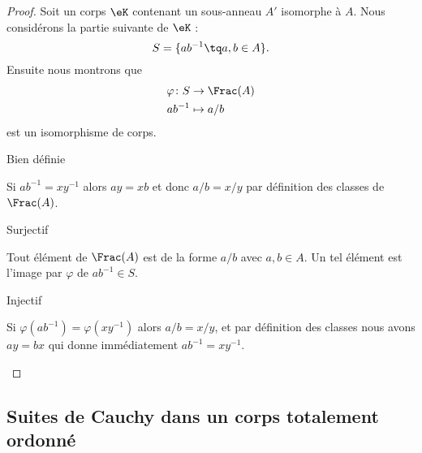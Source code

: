 \begin{proof}
    Soit un corps \( \eK\) contenant un sous-anneau \( A'\) isomorphe à \( A\). Nous considérons la partie suivante de \( \eK\) :
    \begin{equation}
        S=\{ ab^{-1}\tq a,b\in A \}.
    \end{equation}
    Ensuite nous montrons que
    \begin{equation}
        \begin{aligned}
            \varphi\colon S&\to \Frac(A) \\
            ab^{-1}&\mapsto a/b
        \end{aligned}
    \end{equation}
    est un isomorphisme de corps.

    \begin{subproof}
        \item[Bien définie]

            Si \( ab^{-1}=xy^{-1}\) alors \( ay=xb\) et donc \( a/b=x/y\) par définition des classes de \( \Frac(A)\).

        \item[Surjectif]

            Tout élément de \( \Frac(A)\) est de la forme \( a/b\) avec \( a,b\in A\). Un tel élément est l'image par \( \varphi\) de \( ab^{-1}\in S\).

        \item[Injectif]

            Si \( \varphi(ab^{-1})=\varphi(xy^{-1})\) alors \( a/b=x/y\), et par définition des classes nous avons \( ay=bx\) qui donne immédiatement \( ab^{-1}=xy^{-1}\).
    \end{subproof}
\end{proof}

\subsection{Suites de Cauchy dans un corps totalement ordonné}

